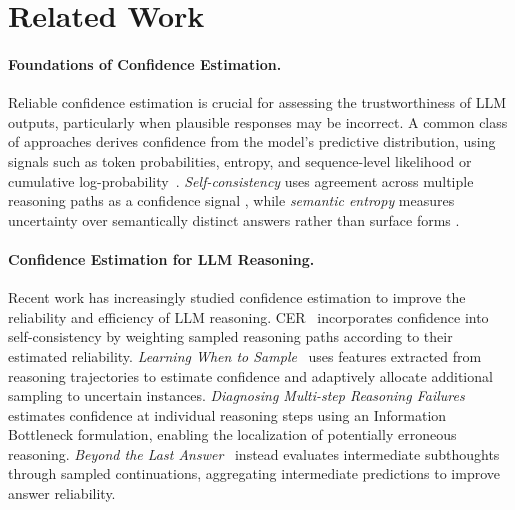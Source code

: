 \documentclass{article} %
\begin{document}
\section{Related Work}

\paragraph{Foundations of Confidence Estimation.}
Reliable confidence estimation is crucial for assessing the trustworthiness of LLM outputs, particularly when plausible responses may be incorrect. A common class of approaches derives confidence from the model's predictive distribution, using signals such as token probabilities, entropy, and sequence-level likelihood or cumulative log-probability~\cite{ulmer2024calibrating}. \emph{Self-consistency} uses agreement across multiple reasoning paths as a confidence signal \citep{wang2023self}, while \emph{semantic entropy} measures uncertainty over semantically distinct answers rather than surface forms \citep{kuhn2023semantic}.

\paragraph{Confidence Estimation for LLM Reasoning.}
Recent work has increasingly studied confidence estimation to improve the reliability and efficiency of LLM reasoning. CER~\cite{razghandi-etal-2025-cer} incorporates confidence into self-consistency by weighting sampled reasoning paths according to their estimated reliability. \emph{Learning When to Sample}~\cite{xiong-etal-2026-learning} uses features extracted from reasoning trajectories to estimate confidence and adaptively allocate additional sampling to uncertain instances. \emph{Diagnosing Multi-step Reasoning Failures}~\cite{liu-etal-2026-stepwise} estimates confidence at individual reasoning steps using an Information Bottleneck formulation, enabling the localization of potentially erroneous reasoning. \emph{Beyond the Last Answer}~\cite{hammoud2025beyond} instead evaluates intermediate subthoughts through sampled continuations, aggregating intermediate predictions to improve answer reliability. 
\end{document}
